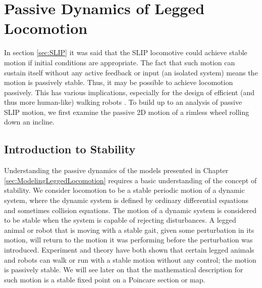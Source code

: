 \chapter{Passive Dynamics of Legged Locomotion}
\label{sec:PassiveDynamicsOfLeggedLocomotion}

In section \ref{sec:SLIP} it was said that the SLIP locomotive could achieve
stable motion if initial conditions are appropriate. The fact that such motion
can sustain itself without any active feedback or input (an isolated system)
means the motion is passively stable. Thus, it may be possible to achieve
locomotion passively. This has various implications, especially for the design
of efficient (and thus more human-like) walking robots \cite{collins}. To build
up to an analysis of passive SLIP motion, we first examine the passive 2D
motion of a rimless wheel rolling down an incline.




\section{Introduction to Stability} %
\label{sec:IntroductionToStability}

Understanding the passive dynamics of the models presented in Chapter
\ref{sec:ModelingLeggedLocomotion} requires a basic understanding of the
concept of stability. We consider locomotion to be a stable periodic motion of
a dynamic system, where the dynamic system is defined by ordinary differential
equations and sometimes collision equations. The motion of a dynamic system is
considered to be stable when the system is capable of rejecting disturbances.
A legged animal or robot that is moving with a stable gait, given some
perturbation in its motion, will return to the motion it was performing before
the perturbation was introduced. Experiment and theory have both shown that
certain legged animals and robots can walk or run with a stable motion without
any control; the motion is passively stable. We will see later on that the
mathematical description for such motion is a stable fixed point on a Poincare
section or map. 

